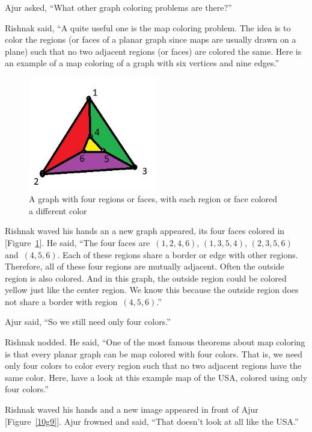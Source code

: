 Ajur asked, ``What other graph coloring problems are there?''

Rishnak said, ``A quite useful one is the map coloring problem. The idea is to color the regions (or faces of a planar graph since maps are usually drawn on a plane) such that no two adjacent regions (or faces) are colored the same. Here is an example of a map coloring of a graph with six vertices and nine edges.'' 

\begin{figure}
\begin{center}
\includegraphics[width=0.5\textwidth]{mapcolor.JPG}
\caption{A graph with four regions or faces, with each region or face colored a different color}\label{10g8}
\end{center}
\end{figure}

Rishnak waved his hands an a new graph appeared, its four faces colored in [Figure~\ref{10g8}]. He said, ``The four faces are~$(1,2,4,6)$, $(1,3,5,4)$, $(2,3,5,6)$ and~$(4,5,6)$. Each of these regions share a border or edge with other regions. Therefore, all of these four regions are mutually adjacent. Often the outside region is also colored. And in this graph, the outside region could be colored yellow just like the center region. We know this because the outside region does not share a border with region~$(4,5,6)$.''

Ajur said, ``So we still need only four colors.''

Rishnak nodded. He said, ``One of the most famous theorems about map coloring is that every planar graph can be map colored with four colors. That is, we need only four colors to color every region such that no two adjacent regions have the same color. Here, have a look at this example map of the USA, colored using only four colors.''

Rishnak waved his hands and a new image appeared in front of Ajur [Figure~\ref{10g9}]. Ajur frowned and said, ``That doesn't look at all like the USA.''


